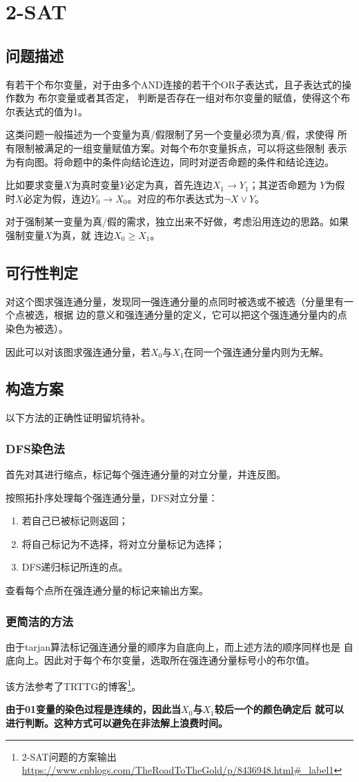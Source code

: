 \section{2-SAT}
\subsection{问题描述}
有若干个布尔变量，对于由多个AND连接的若干个OR子表达式，且子表达式的操作数为
布尔变量或者其否定，
判断是否存在一组对布尔变量的赋值，使得这个布尔表达式的值为1。

这类问题一般描述为一个变量为真/假限制了另一个变量必须为真/假，求使得
所有限制被满足的一组变量赋值方案。对每个布尔变量拆点，可以将这些限制
表示为有向图。将命题中的条件向结论连边，同时对逆否命题的条件和结论连边。

比如要求变量$X$为真时变量$Y$必定为真，首先连边$X_1\rightarrow Y_1$；其逆否命题为
$Y$为假时$X$必定为假，连边$Y_0\rightarrow X_0$。对应的布尔表达式为$\neg X \vee Y$。

对于强制某一变量为真/假的需求，独立出来不好做，考虑沿用连边的思路。如果强制变量$X$为真，就
连边$X_0\geq X_1$。
\subsection{可行性判定}
对这个图求强连通分量，发现同一强连通分量的点同时被选或不被选（分量里有一个点被选，根据
边的意义和强连通分量的定义，它可以把这个强连通分量内的点染色为被选）。

因此可以对该图求强连通分量，若$X_0$与$X_1$在同一个强连通分量内则为无解。
\subsection{构造方案}
以下方法的正确性证明留坑待补。
\subsubsection{DFS染色法}
首先对其进行缩点，标记每个强连通分量的对立分量，并连反图。

按照拓扑序处理每个强连通分量，DFS对立分量：
\begin{enumerate}
    \item 若自己已被标记则返回；
    \item 将自己标记为不选择，将对立分量标记为选择；
    \item DFS递归标记所连的点。
\end{enumerate}
查看每个点所在强连通分量的标记来输出方案。
\subsubsection{更简洁的方法}
由于tarjan算法标记强连通分量的顺序为自底向上，而上述方法的顺序同样也是
自底向上。因此对于每个布尔变量，选取所在强连通分量标号小的布尔值。

该方法参考了TRTTG的博客\footnote{2-SAT问题的方案输出
\url{https://www.cnblogs.com/TheRoadToTheGold/p/8436948.html\#\_label1}}。

{\bfseries 由于01变量的染色过程是连续的，因此当$X_0$与$X_1$较后一个的颜色确定后
就可以进行判断。这种方式可以避免在非法解上浪费时间。}
